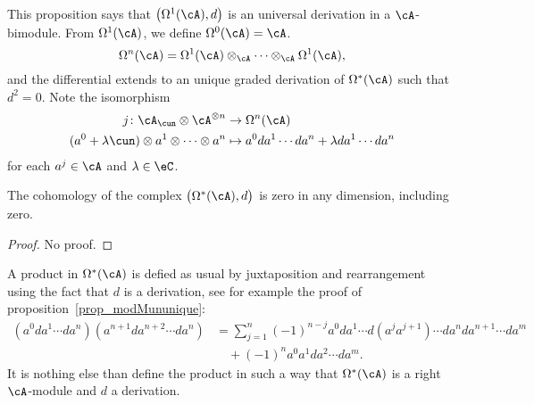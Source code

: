 This proposition says that $\big( \Omega^1(\cA),d \big)$ is an universal derivation in a $\cA$-bimodule. From $\Omega^1(\cA)$, we define $\Omega^0(\cA)=\cA$.
\[
  \Omega^n(\cA)=\Omega^1(\cA)\otimes_{\cA}\cdots\otimes_{\cA}\Omega^1(\cA),
\]
and the differential extends to an unique graded derivation of $\Omega^*(\cA)$ such that $d^2=0$. Note the isomorphism
\begin{equation}
\begin{aligned}
 j\colon \cA_{\cun}\otimes\cA^{\otimes n}&\to\Omega^n(\cA)  \\
(a^0+\lambda\cun)\otimes a^1\otimes\cdots\otimes a^{n}&\mapsto a^0da^1\cdots da^{n}+\lambda da^1\cdots da^{n}
\end{aligned}
\end{equation}
for each $a^{j}\in\cA$ and $\lambda\in\eC$.

\begin{lemma}
The cohomology of the complex $\big( \Omega^*(\cA),d \big)$ is zero in any dimension, including zero.
\end{lemma}
\begin{proof}
No proof.
\end{proof}

A product in $\Omega^*(\cA)$ is defied as usual by juxtaposition and rearrangement using the fact that $d$ is a derivation, see for example the proof of proposition~\ref{prop_modMununique}:
\[
\begin{split}
(a^0da^1\cdots da^{n})(a^{n+1}da^{n+2}\cdots da^{n})&=\sum_{j=1}^{n}(-1)^{n-j}a^0da^1\cdots d(a^{j}a^{j+1})\cdots da^{n}da^{n+1}\cdots da^m\\
					&\quad+(-1)^na^0a^1 da^2\cdots da^{m}.
\end{split}
\]
It is nothing else than define the product in such a way that $\Omega^*(\cA)$ is a right $\cA$-module and $d$ a derivation.



